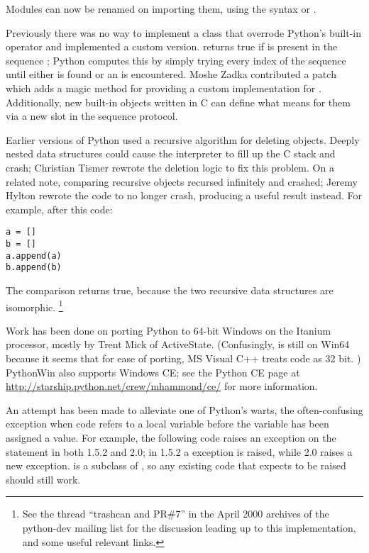 \documentclass{howto}
\begin{document}
Modules can now be renamed on importing them, using the syntax
 or .

Previously there was no way to implement a class that overrode
Python's built-in  operator and implemented a custom
version.   returns true if  is
present in the sequence ; Python computes this by simply
trying every index of the sequence until either  is found or
an  is encountered.  Moshe Zadka contributed a
patch which adds a  magic method for providing a
custom implementation for . Additionally, new built-in
objects written in C can define what  means for them via a
new slot in the sequence protocol.

Earlier versions of Python used a recursive algorithm for deleting
objects.  Deeply nested data structures could cause the interpreter to
fill up the C stack and crash; Christian Tismer rewrote the deletion
logic to fix this problem.  On a related note, comparing recursive
objects recursed infinitely and crashed; Jeremy Hylton rewrote the
code to no longer crash, producing a useful result instead.  For
example, after this code:

\begin{verbatim}
a = []
b = []
a.append(a)
b.append(b)
\end{verbatim}

The comparison  returns true, because the two recursive
data structures are isomorphic.
\footnote{See the thread ``trashcan and PR\#7'' in the April 2000 archives of the python-dev mailing list for the discussion leading up to this implementation, and some useful relevant links.
}

Work has been done on porting Python to 64-bit Windows on the Itanium
processor, mostly by Trent Mick of ActiveState.  (Confusingly,  is still  on
Win64 because it seems that for ease of porting, MS Visual C++ treats code
as 32 bit.
)  PythonWin also supports Windows CE; see the Python CE page at
\url{http://starship.python.net/crew/mhammond/ce/} for more information.

An attempt has been made to alleviate one of Python's warts, the
often-confusing  exception when code refers to a
local variable before the variable has been assigned a value.  For
example, the following code raises an exception on the 
statement in both 1.5.2 and 2.0; in 1.5.2 a 
exception is raised, while 2.0 raises a new
 exception.
 is a subclass of ,
so any existing code that expects  to be raised
should still work.
\end{document}
